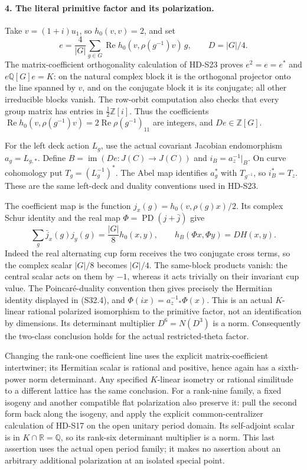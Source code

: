 \paragraph{4. The literal primitive factor and its polarization.}
Take \(v=(1+i)u_1\), so \(h_0(v,v)=2\), and set
\[
 e=\frac4{|G|}\sum_{g\in G}
       \operatorname{Re}h_0(v,\rho(g^{-1})v)\,g,
 \qquad D=|G|/4.
 \tag{S32.3}
\]
The matrix-coefficient orthogonality calculation of HD-S23 proves
\(e^2=e=e^*\) and \(e\mathbb Q[G]e=K\): on the natural
complex block it is the orthogonal projector onto the line spanned
by \(v\), and on the conjugate block it is its conjugate; all
other irreducible blocks vanish. The row-orbit computation also
checks that every group matrix has entries in
\(\tfrac12\mathbb Z[i]\). Thus the coefficients
\(\operatorname{Re}h_0(v,\rho(g^{-1})v)
 =2\operatorname{Re}\rho(g^{-1})_{11}\) are integers, and
\(De\in\mathbb Z[G]\).

For the left deck action \(L_g\), use the actual covariant
Jacobian endomorphism \(a_g=L_{g,*}\). Define
\(B=\operatorname{im}(De:J(C)\to J(C))\) and
\(i_B=a_z^{-1}|_B\). On curve cohomology put
\(T_g=(L_g^{-1})^*\). The Abel map identifies \(a_g^*\) with
\(T_{g^{-1}}\), so \(i_B^*=T_z\). These are the same
left-deck and duality conventions used in HD-S23.

The coefficient map is the function
\(j_x(g)=h_0(v,\rho(g)x)/2\). Its complex Schur identity and
the real map \(\Phi=\operatorname{PD}(j+\bar j)\) give
\[
 \sum_g\bar j_x(g)j_y(g)=\frac{|G|}{8}h_0(x,y),
 \qquad h_B(\Phi x,\Phi y)=D H(x,y).
 \tag{S32.4}
\]
Indeed the real alternating cup form receives the two conjugate
cross terms, so the complex scalar \(|G|/8\) becomes \(|G|/4\).
The same-block products vanish: the central scalar acts on them by
\(-1\), whereas it acts trivially on their invariant cup value.
The Poincar\'e-duality convention then gives precisely the
Hermitian identity displayed in (S32.4), and
\(\Phi(ix)=a_z^{-1}{}_\ast\Phi(x)\). This is an actual
\(K\)-linear rational polarized isomorphism to the primitive
factor, not an identification by dimensions. Its determinant
multiplier \(D^6=N(D^3)\) is a norm. Consequently the two-class
conclusion holds for the actual restricted-theta factor.

Changing the rank-one coefficient line uses the explicit
matrix-coefficient intertwiner; its Hermitian scalar is rational
and positive, hence again has a sixth-power norm determinant.
Any specified \(K\)-linear isometry or rational similitude to a
different lattice has the same conclusion. For a rank-nine family,
a fixed isogeny and another compatible flat polarization also
preserve it: pull the second form back along the isogeny, and apply
the explicit common-centralizer calculation of HD-S17 on the open
unitary period domain. Its self-adjoint scalar is in
\(K\cap\mathbb R=\mathbb Q\), so its rank-six determinant
multiplier is a norm. This last assertion uses the actual open
period family; it makes no assertion about an arbitrary additional
polarization at an isolated special point.

